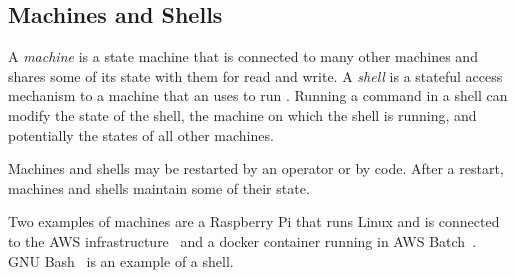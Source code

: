 \subsection{Machines and Shells}\label{machine}

A \emph{machine} is a state machine that is connected to many other machines and shares some of its state with them for read and write. A \emph{shell} is a stateful access mechanism to a machine that an  uses to run . Running a command in a shell can modify the state of the shell, the machine on which the shell is running, and potentially the states of all other machines. 

Machines and shells may be restarted by an operator or by code. After a restart, machines and shells maintain some of their state. 

Two examples of machines are a Raspberry Pi that runs Linux and is connected to the AWS infrastructure~\cite{aws} and a docker container running in AWS Batch~\cite{aws_batch}. GNU Bash~\cite{gnu_bash} is an example of a shell.